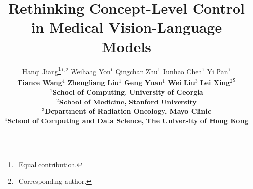 \documentclass[11pt]{article}
\title{Rethinking Concept-Level Control in Medical Vision-Language Models}
\author{%
  Hanqi Jiang\thanks{\ Equal contribution.}$^{1,2}$ \quad
  Weihang You\footnotemark[1]$^{1}$ \quad
  Qingchan Zhu$^{1}$ \quad
  Junhao Chen$^{1}$ \quad
  Yi Pan$^{1}$ \\
  \bfseries
  Tiance Wang$^{4}$ \quad
  Zhengliang Liu$^{1}$ \quad
  Geng Yuan$^{1}$ \quad
  Wei Liu$^{3}$ \quad
  Lei Xing$^{2}$\thanks{\ Corresponding author.} \\
  $^{1}$School of Computing, University of Georgia \\
  $^{2}$School of Medicine, Stanford University \\
  $^{3}$Department of Radiation Oncology, Mayo Clinic \\
  $^{4}$School of Computing and Data Science, The University of Hong Kong
}
\begin{document}
\maketitle

\begin{abstract}

\end{abstract}














\appendix





\end{document}
